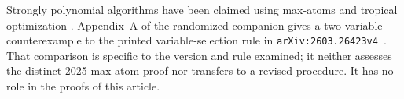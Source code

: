 Strongly polynomial algorithms have been claimed using max-atoms and
tropical optimization
\cite{Truffet2025MaxAtoms,Truffet2026SubstitutionV4}.
Appendix~A of the randomized companion gives a two-variable
counterexample to the printed variable-selection rule in
\texttt{arXiv:2603.26423v4}~\cite{OpenAI2026Randomized}.
That comparison is specific to the version and rule examined; it
neither assesses the distinct 2025 max-atom proof nor transfers to
a revised procedure. It has no role in the proofs of this article.
